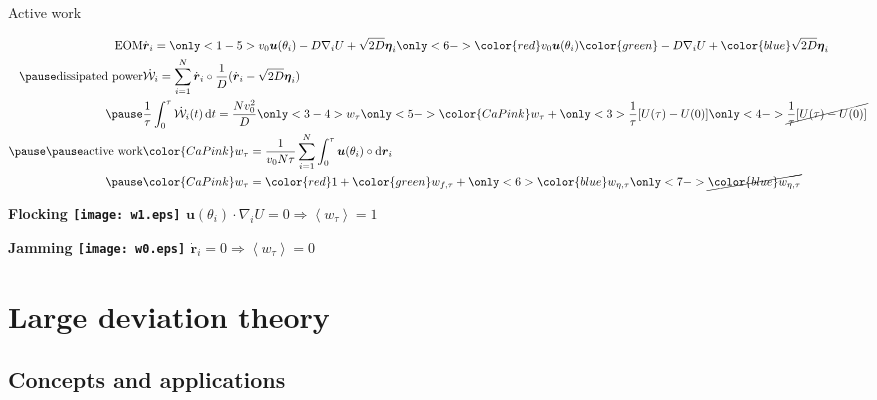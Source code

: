 \documentclass{beamer}
\begin{document}
\begin{frame}{Active work}

\vspace{-15pt}
\begin{eqnarray}
\text{EOM}& \dot{\boldsymbol{r}}_i = \only<1-5>{v_0 \boldsymbol{u}(\theta_i) - D \nabla_i U + \sqrt{2 D} \boldsymbol{\eta}_i}\only<6->{{\color{red} v_0 \boldsymbol{u}(\theta_i)} {\color{green} - D \nabla_i U} + {\color{blue} \sqrt{2 D} \boldsymbol{\eta}_i}}\\ \pause
\text{dissipated power}& \dot{\mathcal{W}}_i = \sum_{i=1}^N \dot{\boldsymbol{r}}_i \circ \frac{1}{D} (\dot{\boldsymbol{r}}_i - \sqrt{2 D} \boldsymbol{\eta}_i)\\ \pause
& \frac{1}{\tau} \int_0^{\tau} \dot{\mathcal{W}}_i(t) \, \mathrm{d}t = \frac{N v_0^2}{D} \only<3-4>{w_{\tau}}\only<5->{{\color{CaPink} w_{\tau}}} + \only<3>{\frac{1}{\tau} [U(\tau) - U(0)]}\only<4->{\cancel{\frac{1}{\tau} [U(\tau) - U(0)]}}\\ \pause\pause
\text{active work}& {\color{CaPink} w_{\tau} = \frac{1}{v_0 N \tau} \sum_{i=1}^N \int_0^{\tau} \boldsymbol{u}(\theta_i) \circ \mathrm{d}\boldsymbol{r}_i} \\ \pause
& {\color{CaPink} w_{\tau}} = {\color{red} 1} + {\color{green} w_{f, \tau}} + \only<6>{{\color{blue} w_{\eta, \tau}}}\only<7->{\cancel{{\color{blue} w_{\eta, \tau}}}}
\end{eqnarray}
\pause

\pause
\hfill
\begin{minipage}{0.4\linewidth}
\centering
\bf Flocking
\texttt{[image: w1.eps]}
$\boldsymbol{u}(\theta_i) \cdot \nabla_i U = 0 \Rightarrow \left<w_{\tau}\right> = 1$
\end{minipage}
\hfill
\begin{minipage}{0.4\linewidth}
\centering
\bf Jamming
\texttt{[image: w0.eps]}
$\dot{\boldsymbol{r}}_i = 0 \Rightarrow \left<w_{\tau}\right> = 0$
\end{minipage}
\hfill\hfill

\end{frame}

\section{Large deviation theory}

\subsection{Concepts and applications}
\end{document}
